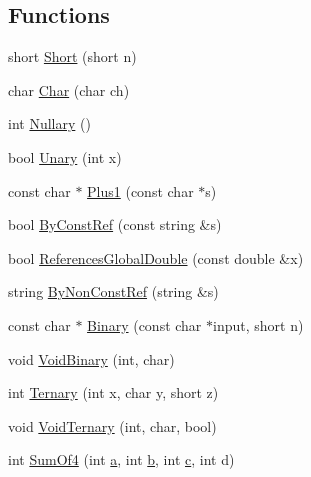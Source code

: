 \subsection*{Functions}
\begin{DoxyCompactItemize}
\item 
short \hyperlink{namespacetesting_1_1gmock__generated__actions__test_a7c442b3594b6717b8d499781a82170b2}{Short} (short n)
\item 
char \hyperlink{namespacetesting_1_1gmock__generated__actions__test_aa07e216a4c9d492fb7e7c8fde949bc8f}{Char} (char ch)
\item 
int \hyperlink{namespacetesting_1_1gmock__generated__actions__test_acb3d926ebbe88529c38d95f5e61573ef}{Nullary} ()
\item 
bool \hyperlink{namespacetesting_1_1gmock__generated__actions__test_a61f0e6c3f2c07079299f1d6e1667ab92}{Unary} (int x)
\item 
const char $\ast$ \hyperlink{namespacetesting_1_1gmock__generated__actions__test_a75e901c6d28c591c53a54320a294da55}{Plus1} (const char $\ast$s)
\item 
bool \hyperlink{namespacetesting_1_1gmock__generated__actions__test_a5886409b3306d3ff2fe548f9747f1de8}{By\+Const\+Ref} (const string \&s)
\item 
bool \hyperlink{namespacetesting_1_1gmock__generated__actions__test_a3e552b41de08f0516f4b0e32fed68a61}{References\+Global\+Double} (const double \&x)
\item 
string \hyperlink{namespacetesting_1_1gmock__generated__actions__test_a2d12f232cedb11c5955db0ebb1429eb2}{By\+Non\+Const\+Ref} (string \&s)
\item 
const char $\ast$ \hyperlink{namespacetesting_1_1gmock__generated__actions__test_a3ec2020ddbfa6f2e993e0f88be1e691f}{Binary} (const char $\ast$input, short n)
\item 
void \hyperlink{namespacetesting_1_1gmock__generated__actions__test_af957302d6c2b4dacd31385f2a34b529f}{Void\+Binary} (int, char)
\item 
int \hyperlink{namespacetesting_1_1gmock__generated__actions__test_a1b234626e33284c4159ea666d240d5ed}{Ternary} (int x, char y, short z)
\item 
void \hyperlink{namespacetesting_1_1gmock__generated__actions__test_a7b1b519421c70b90ea3c818d4cf565ac}{Void\+Ternary} (int, char, bool)
\item 
int \hyperlink{namespacetesting_1_1gmock__generated__actions__test_a2a5879c060adacf27c3528260172a7be}{Sum\+Of4} (int \hyperlink{_07copy_08_2_read_camera_model_8m_a551a3d351eadcc0b9b1a2f24f0fb5ea0}{a}, int \hyperlink{jquery_8js_a2fa551895933fae935a0a6b87282241d}{b}, int \hyperlink{jquery_8js_abce695e0af988ece0826d9ad59b8160d}{c}, int d)

\end{DoxyCompactItemize}
